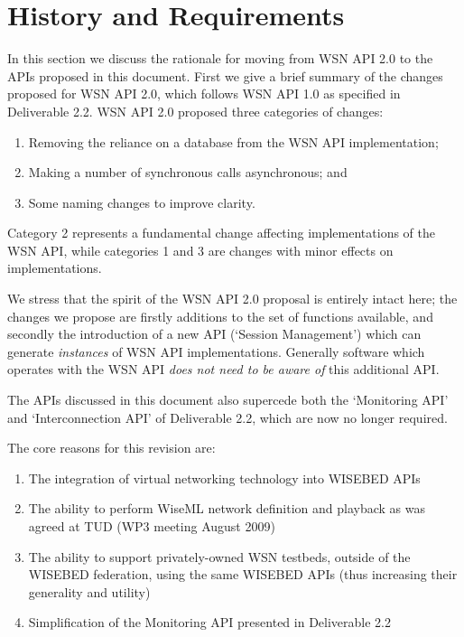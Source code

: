 \section{History and Requirements}
In this section we discuss the rationale for moving from WSN API 2.0 to the APIs proposed in this document. First we give a brief summary of the changes proposed for WSN API 2.0, which follows WSN API 1.0 as specified in Deliverable 2.2. WSN API 2.0 proposed three categories of changes: 

\begin{enumerate}
	\item Removing the reliance on a database from the WSN API implementation; 
	\item Making a number of synchronous calls asynchronous; and
	\item Some naming changes to improve clarity.
\end{enumerate}

Category 2 represents a fundamental change affecting implementations of the WSN API, while categories 1 and 3 are changes with minor effects on implementations.

We stress that the spirit of the WSN API 2.0 proposal is entirely intact here; the changes we propose are firstly additions to the set of functions available, and secondly the introduction of a new API (`Session Management') which can generate {\em instances} of WSN API implementations. Generally software which operates with the WSN API {\em does not need to be aware of} this additional API.

The APIs discussed in this document also supercede both the `Monitoring API' and `Interconnection API' of Deliverable 2.2, which are now no longer required.

The core reasons for this revision are:

\begin{enumerate}
	\item The integration of virtual networking technology into WISEBED APIs
	\item The ability to perform WiseML network definition and playback as was agreed at TUD (WP3 meeting August 2009)
	\item The ability to support privately-owned WSN testbeds, outside of the WISEBED federation, using the same WISEBED APIs (thus increasing their generality and utility)
	\item Simplification of the Monitoring API presented in Deliverable 2.2
\end{enumerate}

